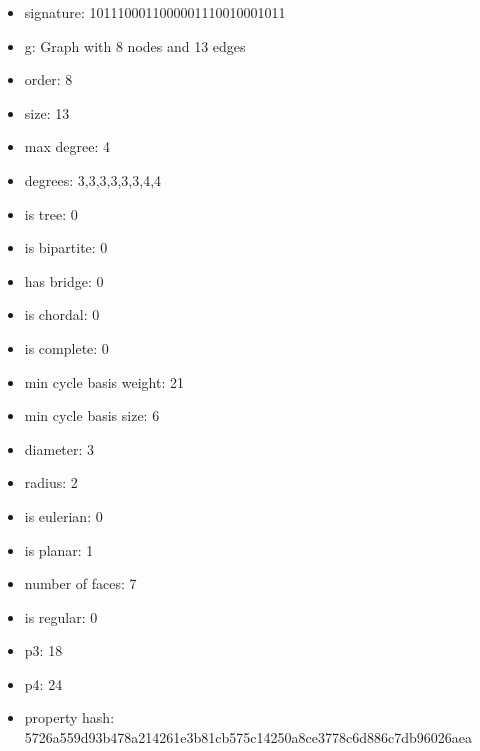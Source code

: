 \begin{itemize}
\item signature: 1011100011000001110010001011
\item g: Graph with 8 nodes and 13 edges
\item order: 8
\item size: 13
\item max degree: 4
\item degrees: 3,3,3,3,3,3,4,4
\item is tree: 0
\item is bipartite: 0
\item has bridge: 0
\item is chordal: 0
\item is complete: 0
\item min cycle basis weight: 21
\item min cycle basis size: 6
\item diameter: 3
\item radius: 2
\item is eulerian: 0
\item is planar: 1
\item number of faces: 7
\item is regular: 0
\item p3: 18
\item p4: 24
\item property hash: 5726a559d93b478a214261e3b81cb575c14250a8ce3778c6d886c7db96026aea
\end{itemize}
\newpage
\begin{figure}
\end{figure}

